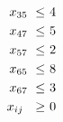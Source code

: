 \documentclass [a4paper,11pt]{article}
\begin{document}
\begin{enumerate}
\begin{enumerate}
\begin{align*}
\begin{alignedat}{6}
                &&        &    &         &    &         &    &\ x_{35} &\ \leq &\ 4 \\
                &&        &    &         &    &         &    &\ x_{47} &\ \leq &\ 5 \\
                &&        &    &         &    &         &    &\ x_{57} &\ \leq &\ 2 \\
                &&        &    &         &    &         &    &\ x_{65} &\ \leq &\ 8 \\
                &&        &    &         &    &         &    &\ x_{67} &\ \leq &\ 3 \\
                && & & & & & & \llap{ $ x_{ij} $ } &\ \geq &\ 0
                \end{alignedat}
                \end{align*}

                \newpage


\end{enumerate}
\end{enumerate}
\end{document}

